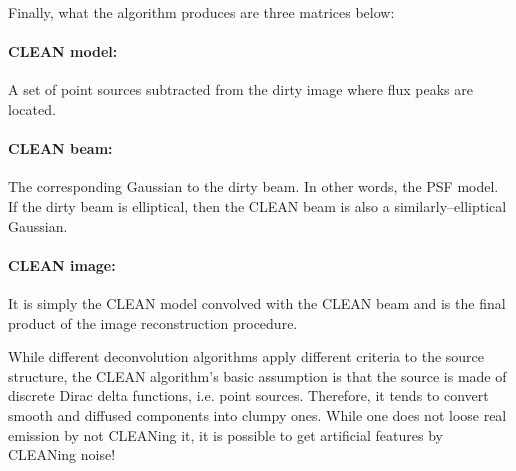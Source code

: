 \documentclass[a4wide,12pt]{book}
\begin{document}
{Finally, what the algorithm produces are three matrices below:
\paragraph*{CLEAN model:} A set of point sources subtracted from the dirty image where flux peaks are located.
\paragraph*{CLEAN beam:} The corresponding Gaussian to the dirty beam. In other words, the PSF model. If the dirty beam is elliptical, then the CLEAN beam is also a similarly--elliptical Gaussian.
\paragraph*{CLEAN image:} It is simply the CLEAN model convolved with the CLEAN beam and is the final product of the image reconstruction procedure. 


While different deconvolution algorithms apply different criteria to the source structure, the CLEAN algorithm's basic assumption is that the source is made of discrete Dirac delta functions, i.e. point sources. Therefore, it tends to convert smooth and diffused components into clumpy ones. While one does not loose real emission by not CLEANing it, it is possible to get artificial features by CLEANing noise!

}
\end{document}
